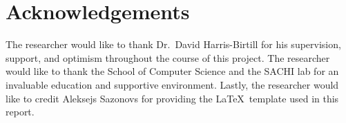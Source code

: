 


\chapter{Acknowledgements}

\label{chapter:acknowledgements}

The researcher would like to thank Dr.\ David Harris-Birtill for his supervision, support, and optimism throughout the course of this project. The researcher would like to thank the School of Computer Science and the SACHI lab for an invaluable education and supportive environment. Lastly, the researcher would like to credit Aleksejs Sazonovs for providing the \LaTeX \, template used in this report.


